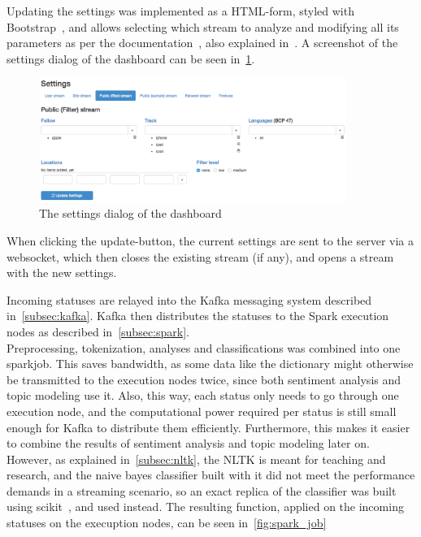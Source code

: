 
Updating the settings was implemented as a HTML-form, styled with Bootstrap~\cite{bootstrapDocs},
and allows selecting which stream to analyze and modifying all its parameters as per the documentation~\cite{twitterDocs},
also explained in~\cite{subsec:streaming}.
A screenshot of the settings dialog of the dashboard can be seen in~\ref{fig:dashboard-settings}.

\begin{figure}
    \centering
    \caption{The settings dialog of the dashboard}
    \label{fig:dashboard-settings}
    \includegraphics[width=10cm]{../images/dashboard_settings.png}
\end{figure}

When clicking the update-button, the current settings are sent to the server via a websocket,
which then closes the existing stream (if any), and opens a stream with the new settings.
\par
Incoming statuses are relayed into the Kafka messaging system described in~\ref{subsec:kafka}.
Kafka then distributes the statuses to the Spark execution nodes as described in~\ref{subsec:spark}.
\\
Preprocessing, tokenization, analyses and classifications was combined into one sparkjob.
This saves bandwidth, as some data like the dictionary might otherwise be transmitted to the execution nodes twice,
since both sentiment analysis and topic modeling use it.
Also, this way, each status only needs to go through one execution node,
and the computational power required per status is still small enough for Kafka to distribute them efficiently.
Furthermore, this makes it easier to combine the results of sentiment analysis and topic modeling later on.
However, as explained in~\ref{subsec:nltk}, the NLTK is meant for teaching and research,
and the naive bayes classifier built with it did not meet the performance demands in a streaming scenario,
so an exact replica of the classifier was built using scikit~\cite{scikitDocs}, and used instead.
The resulting function, applied on the incoming statuses on the execuption nodes, can be seen in~\ref{fig:spark_job}

